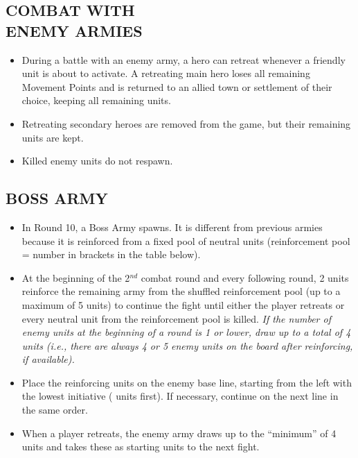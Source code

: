 \begin{multicols*}{2}
\subsection*{\MakeUppercase{Combat with\\Enemy Armies}}

\begin{itemize}
  \item During a battle with an enemy army, a hero can retreat whenever a friendly unit is about to activate.
    A retreating main hero loses all remaining Movement Points and is returned to an allied town or settlement of their choice, keeping all remaining units.
  \item Retreating secondary heroes are removed from the game, but their remaining units are kept.
  \item Killed enemy units do not respawn.
\end{itemize}

\subsection*{\MakeUppercase{Boss Army}}

\begin{itemize}
  \item In Round 10, a Boss Army spawns. It is different from previous armies because it is reinforced from a fixed pool of neutral units (reinforcement pool = number in brackets in the table below).
  \item At the beginning of the 2$^{nd}$ combat round and every following round, 2 units reinforce the remaining army from the shuffled reinforcement pool (up to a maximum of 5 units) to continue the fight until either the player retreats or every neutral unit from the reinforcement pool is killed. \textit{If the number of enemy units at the beginning of a round is 1 or lower, draw up to a total of 4 units (i.e., there are always 4 or 5 enemy units on the board after reinforcing, if available).}
  \item Place the reinforcing units on the enemy base line, starting from the left with the lowest initiative ( units first). If necessary, continue on the next line in the same order.
  \item When a player retreats, the enemy army draws up to the ``minimum'' of 4 units and takes these as starting units to the next fight.
\end{itemize}

\end{multicols*}

